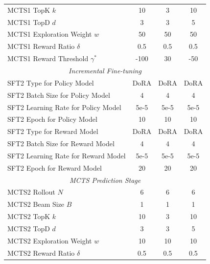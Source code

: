 \documentclass{article}
\theoremstyle{plain}
\theoremstyle{definition}
\theoremstyle{remark}
\begin{document}
\begin{table}[h!t]
{\begin{tabular}{lccc}
MCTS1 TopK $k$                       & 10               & 3               & 10              \\
MCTS1 TopD $d$                       & 3                & 3               & 5               \\
MCTS1 Exploration Weight $w$         & 50               & 50              & 50              \\
MCTS1 Reward Ratio $\delta$               & 0.5              & 0.5             & 0.5             \\
MCTS1 Reward Threshold $\gamma^*$           & -100             & 30              & -50             \\ \midrule
\multicolumn{4}{c}{\textit{Incremental Fine-tuning}} \\ \midrule
SFT2 Type for Policy Model       & DoRA             & DoRA            & DoRA            \\
SFT2 Batch Size for Policy Model & 4                & 4               & 4               \\
SFT2 Learning Rate for Policy Model & 5e-5          & 5e-5            & 5e-5            \\
SFT2 Epoch for Policy Model      & 10               & 10              & 10              \\
SFT2 Type for Reward Model       & DoRA             & DoRA            & DoRA            \\
SFT2 Batch Size for Reward Model & 4                & 4               & 4               \\
SFT2 Learning Rate for Reward Model & 5e-5          & 5e-5            & 5e-5            \\
SFT2 Epoch for Reward Model      & 20               & 20              & 20              \\ \midrule
\multicolumn{4}{c}{\textit{MCTS Prediction Stage}} \\ \midrule
MCTS2 Rollout $N$                    & 6                & 6               & 6               \\
MCTS2 Beam Size $B$                  & 1                & 1               & 1               \\
MCTS2 TopK $k$                       & 10               & 3               & 10              \\
MCTS2 TopD $d$                       & 3                & 3               & 5               \\
MCTS2 Exploration Weight $w$         & 10               & 10              & 10              \\
MCTS2 Reward Ratio $\delta$               & 0.5              & 0.5             & 0.5             \\ \bottomrule
\end{tabular}}
\end{table}
\end{document}

